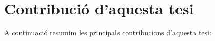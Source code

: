 










\section{Contribució d'aquesta tesi}


A continuació resumim les principals contribucions d'aquesta tesi:

